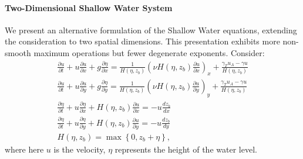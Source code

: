 \documentclass{article}
\newcommand{\1}{\mathds{1}}          %
\theoremstyle{definition}
\begin{document}
\begin{sloppypar}
\paragraph{Two-Dimensional Shallow Water System}
We present an alternative formulation of the Shallow Water equations, extending the consideration to two spatial dimensions. This presentation exhibits more non-smooth maximum operations but fewer degenerate exponents. Consider:
\begin{equation}\label{eq:swe2d}
    \begin{array}{l}
    \frac{\partial u}{\partial t}+u \frac{\partial u}{\partial x}+g\frac{\partial \eta}{\partial x}=\frac{1}{H(\eta,z_b)}\left(\nu H(\eta,z_b) \frac{\partial u}{\partial x}\right)_x+\frac{\gamma_T u_A-\gamma u}{H(\eta,z_b)} \\
    \frac{\partial u}{\partial t}+u \frac{\partial u}{\partial y}+g\frac{\partial \eta}{\partial y}=\frac{1}{H(\eta,z_b)}\left(\nu H(\eta,z_b) \frac{\partial u}{\partial y}\right)_y+\frac{\gamma_T u_A-\gamma u}{H(\eta,z_b)} \\
    \frac{\partial \eta}{\partial t} + u \frac{\partial \eta}{\partial x}+H(\eta,z_b) \frac{\partial u}{\partial x} = - u \frac{dz_b}{dx} \\
    \frac{\partial \eta}{\partial t} + u \frac{\partial \eta}{\partial y}+H(\eta,z_b) \frac{\partial u}{\partial y} = - u \frac{dz_b}{dy} \\
    H(\eta,z_b) = \max\left\{0,z_b+\eta\right\},
    \end{array}
\end{equation}
where here $u$ is the velocity, $\eta$ represents the height of the water level. 





\end{sloppypar}
\end{document}
